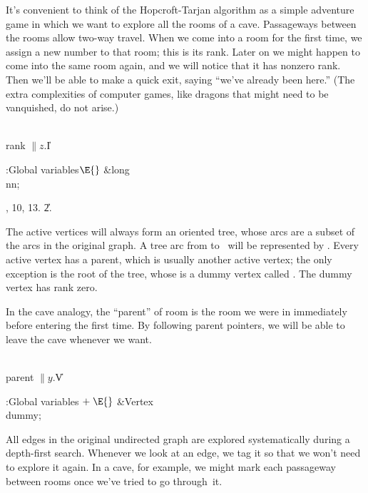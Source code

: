 It's convenient to think of the Hopcroft-Tarjan algorithm as a simple adventure
game in which we want to explore all the rooms of a cave. Passageways between
the rooms allow two-way travel. When we come
into a room for the first time, we assign a new number to that room;
this is its rank. Later on we might happen to come into the same room
again, and we will notice that it has nonzero rank. Then we'll be able
to make a quick exit, saying ``we've already been here.'' (The extra
complexities of computer games, like dragons that might need to be
vanquished, do not arise.)

\Y\B\4\D\\{rank}\5
$\|z.{}$\|I\par
\Y\B\4:Global variables\X${}\E{}$\6
\&{long} \\{nn};\par
{}, 10, 13.
\U2.\fi

The active vertices will always form an oriented tree, whose arcs are
a subset of the arcs in the original graph. A tree arc from  to~
will be represented by . Every active vertex has a
parent, which is usually another active vertex; the only exception is
the root of the tree, whose  is a dummy vertex called .
The dummy vertex has rank zero.

In the cave analogy, the ``parent'' of room  is the room we were in
immediately before entering  the first time. By following parent
pointers, we will be able to leave the cave whenever we want.

\Y\B\4\D\\{parent}\5
$\|y.{}$\|V\par
\Y\B\4:Global variables\X${}\mathrel+\E{}$\6
\&{Vertex} \\{dummy};\par
\fi

All edges in the original undirected graph are explored systematically
during
a depth-first search. Whenever we look at an edge, we tag it so that
we won't need to explore it again. In a cave, for example, we might
mark each passageway between rooms once we've tried to go through~it.

